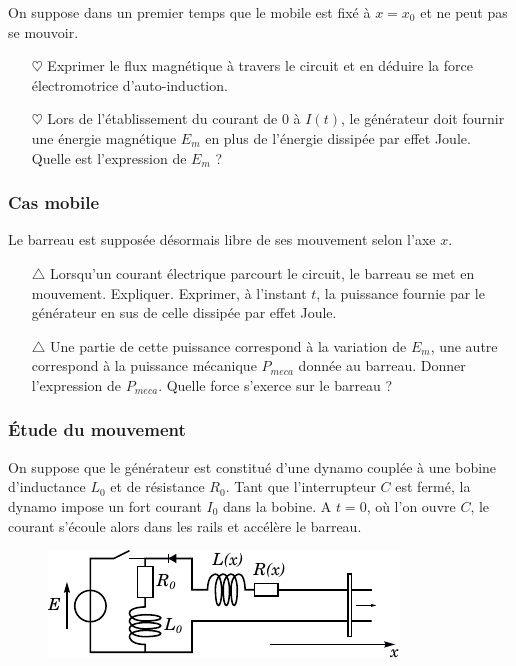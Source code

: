 \documentclass{report}
\begin{document}
On suppose dans un premier temps que le mobile est fixé à $x=x_0$ et ne peut pas se mouvoir. 

\begin{itemize}

	\item[$\heartsuit$] Exprimer le flux magnétique à travers le circuit et en déduire la force électromotrice d'auto-induction.
	
	\item[$\heartsuit$] Lors de l'établissement du courant de 0 à $I(t)$, le générateur doit fournir une énergie magnétique $E_m$ en plus de l'énergie dissipée par effet Joule. Quelle est l'expression de $E_m$ ?

\end{itemize}

\subsubsection*{Cas mobile}

Le barreau est supposée désormais libre de ses mouvement selon l'axe $x$. 

\begin{itemize}

	\item[$\triangle$] Lorsqu'un courant électrique parcourt le circuit, le barreau se met en mouvement. Expliquer. Exprimer, à l'instant $t$, la puissance fournie par le générateur en sus de celle dissipée par effet Joule. 
	
	\item[$\triangle$] Une partie de cette puissance correspond à la variation de $E_m$, une autre correspond à la puissance mécanique $P_{meca}$ donnée au barreau. Donner l'expression de $P_{meca}$. Quelle force s'exerce sur le barreau ?

\end{itemize}

\subsubsection*{Étude du mouvement}

On suppose que le générateur est constitué d'une dynamo couplée à une bobine d'inductance $L_0$ et de résistance $R_0$. Tant que l'interrupteur $C$ est fermé, la dynamo impose un fort courant $I_0$ dans la bobine. A $t=0$, où l'on ouvre $C$, le courant s'écoule alors dans les rails et accélère le barreau. 

\begin{figure}[h!]
\centering
		\includegraphics[scale=1]{induction2.pdf}
\end{figure}
\end{document}
